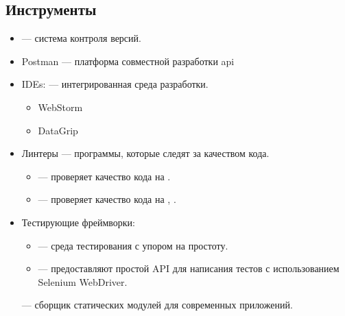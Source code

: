 \subsection{Инструменты}
\begin{itemize}
    \item \textcite{git} --- система контроля версий.
    \item Postman --- платформа совместной разработки \acrshort{api}
    \item IDEs: --- интегрированная среда разработки.
    \begin{itemize}
        \item WebStorm
        \item DataGrip
    \end{itemize}
    \item Линтеры --- программы, которые следят за качеством кода.
    \begin{itemize}
        \item \textcite{eslint} --- проверяет качество кода на \textcite{wiki:js}.
        \item \textcite{stylelint} --- проверяет качество кода на \textcite{scss}, \textcite{wiki:css}.
    \end{itemize}
    \item Тестирующие фреймворки:
    \begin{itemize}
        \item \textcite{jest} --- среда тестирования \textcite{wiki:js} с упором на простоту.
        \item \textcite{selenium-python} --- предоставляют простой API для написания тестов с использованием Selenium WebDriver.
    \end{itemize}
    \textcite{webpack} --- сборщик статических модулей для современных \textcite{wiki:js} приложений.
\end{itemize}

\clearpage